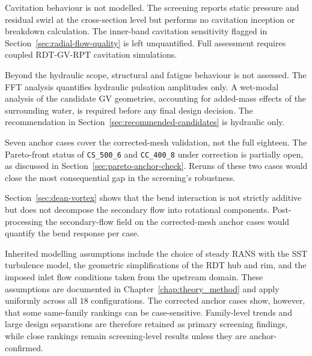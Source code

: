 Cavitation behaviour is not modelled. The screening reports static pressure and residual swirl at the cross-section level but performs no cavitation inception or breakdown calculation. The inner-band cavitation sensitivity flagged in Section~\ref{sec:radial-flow-quality} is left unquantified. Full assessment requires coupled RDT-GV-RPT cavitation simulations.

Beyond the hydraulic scope, structural and fatigue behaviour is not assessed. The FFT analysis quantifies hydraulic pulsation amplitudes only. A wet-modal analysis of the candidate GV geometries, accounting for added-mass effects of the surrounding water, is required before any final design decision. The recommendation in Section~\ref{sec:recommended-candidates} is hydraulic only.

Seven anchor cases cover the corrected-mesh validation, not the full eighteen. The Pareto-front status of \texttt{CS\_500\_6} and \texttt{CC\_400\_8} under correction is partially open, as discussed in Section~\ref{sec:pareto-anchor-check}. Reruns of these two cases would close the most consequential gap in the screening's robustness.

Section~\ref{sec:dean-vortex} shows that the bend interaction is not strictly additive but does not decompose the secondary flow into rotational components. Post-processing the secondary-flow field on the corrected-mesh anchor cases would quantify the bend response per case.

Inherited modelling assumptions include the choice of steady RANS with the SST turbulence model, the geometric simplifications of the RDT hub and rim, and the imposed inlet flow conditions taken from the upstream domain. These assumptions are documented in Chapter~\ref{chap:theory_method} and apply uniformly across all \(18\) configurations. The corrected anchor cases show, however, that some same-family rankings can be case-sensitive. Family-level trends and large design separations are therefore retained as primary screening findings, while close rankings remain screening-level results unless they are anchor-confirmed.

\clearpage %